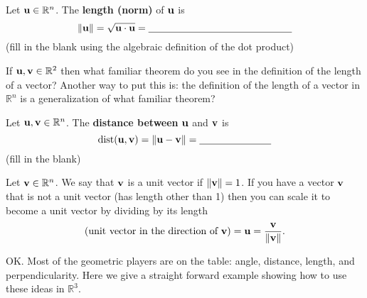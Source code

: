\begin{definition}
    Let ${\bf u} \in \mathbb{R}^n$.  The {\bf length (norm)} of ${\bf u}$ is
    \[ \| {\bf u} \| = \sqrt{{\bf u} \cdot {\bf u}} = \underline{\hspace{2in}} \]
    (fill in the blank using the algebraic definition of the dot product)
\end{definition}

\begin{problem}
    If ${\bf u},{\bf v} \in \mathbb{R}^2$ then what familiar theorem do you see in the definition
    of the length of a vector?  Another way to put this is: the definition of the length
    of a vector in $\mathbb{R}^n$ is a generalization of what familiar theorem?
\end{problem}

\begin{definition}
    Let ${\bf u},{\bf v}\in\mathbb{R}^n$.  The {\bf distance between} ${\bf u}$ and ${\bf v}$ is
    \[ \text{dist}({\bf u},{\bf v}) = \| {\bf u} - {\bf v}\| = \underline{\hspace{1in}} \]
    (fill in the blank)
\end{definition}

\begin{definition}
    Let ${\bf v} \in \mathbb{R}^n$.  We say that ${\bf v}$ is a unit vector if $\|{\bf v}\| = 1$.  If
    you have a vector ${\bf v}$ that is not a unit vector (has length other than 1) then you
    can scale it to become a unit vector by dividing by its length
    \[ (\text{unit vector in the direction of ${\bf v}$}) = {\bf u} = \frac{{\bf v}}{\|{\bf v}\|}. \]
\end{definition}

OK.  Most of the geometric players are on the table: angle, distance, length, and
perpendicularity.  Here we give a straight forward example showing how to use these ideas
in $\mathbb{R}^3$.


